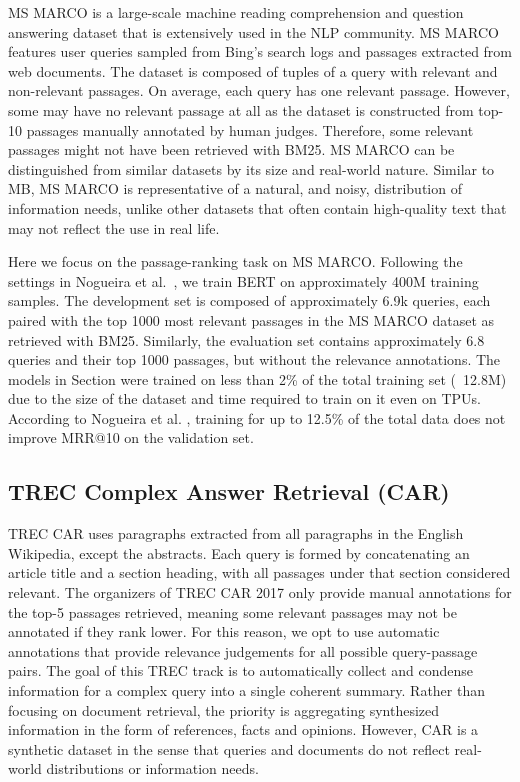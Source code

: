 MS MARCO is a large-scale machine reading comprehension and question answering dataset that is extensively used in the NLP community.
MS MARCO \cite{nguyen2016msmarco} features user queries sampled from Bing’s search logs and passages extracted from web documents.
The dataset is composed of tuples of a query with relevant and non-relevant passages.
On average, each query has one relevant passage.
However, some may have no relevant passage at all as the dataset is constructed from  top-10 passages manually annotated by human judges.
Therefore, some relevant passages might not have been retrieved with BM25.
MS MARCO can be distinguished from similar datasets by its size and real-world nature.
Similar to MB, MS MARCO is representative of a natural, and noisy, distribution of information needs, unlike other datasets that often contain high-quality text that may not reflect the use in real life.

Here we focus on the passage-ranking task on MS MARCO.
Following the settings in Nogueira et al.~\cite{}, we train BERT on approximately 400M training samples.
The development set is composed of approximately 6.9k queries, each paired with the top 1000 most relevant passages in the MS MARCO dataset as retrieved with BM25.
Similarly, the evaluation set contains approximately 6.8 queries and their top 1000 passages, but without the relevance annotations.
The models in Section  were trained on less than 2\% of the total training set (~12.8M) due to the size of the dataset and time required to train on it even on TPUs.
According to Nogueira et al. \cite{nogueira2019passage}, training for up to 12.5\% of the total data does not improve MRR@10 on the validation set.

\subsection{TREC Complex Answer Retrieval (CAR)}

TREC CAR \cite{dietz2017trec} uses paragraphs extracted from all paragraphs in the English Wikipedia, except the abstracts.
Each query is formed by concatenating an article title and a section heading, with all passages under that section considered relevant.
The organizers of TREC CAR 2017 only provide manual annotations for the top-5 passages retrieved, meaning some relevant passages may not be annotated if they rank lower.
For this reason, we opt to use automatic annotations that provide relevance judgements for all possible query-passage pairs.
The goal of this TREC track is to automatically collect and condense information for a complex query into a single coherent summary.
Rather than focusing on document retrieval, the priority is aggregating synthesized information in the form of references, facts and opinions.
However, CAR is a synthetic dataset in the sense that queries and documents do not reflect real-world distributions or information needs.

